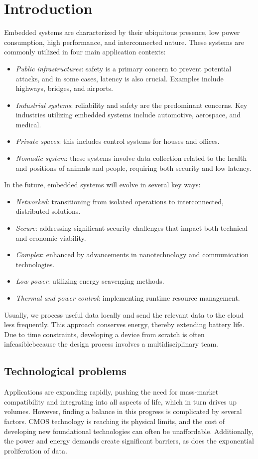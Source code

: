 \section{Introduction}

Embedded systems are characterized by their ubiquitous presence, low power consumption, high performance, and interconnected nature.
These systems are commonly utilized in four main application contexts:
\begin{itemize}
    \item \textit{Public infrastructures}: safety is a primary concern to prevent potential attacks, and in some cases, latency is also crucial. 
        Examples include highways, bridges, and airports.
    \item \textit{Industrial systems}: reliability and safety are the predominant concerns. 
        Key industries utilizing embedded systems include automotive, aerospace, and medical.
    \item \textit{Private spaces}: this includes control systems for houses and offices.
    \item \textit{Nomadic system}: these systems involve data collection related to the health and positions of animals and people, requiring both security and low latency.
\end{itemize}
In the future, embedded systems will evolve in several key ways:
\begin{itemize}
    \item \textit{Networked}: transitioning from isolated operations to interconnected, distributed solutions.
    \item \textit{Secure}: addressing significant security challenges that impact both technical and economic viability.
    \item \textit{Complex}: enhanced by advancements in nanotechnology and communication technologies.
    \item \textit{Low power}: utilizing energy scavenging methods.
    \item \textit{Thermal and power control}: implementing runtime resource management.
\end{itemize}
Usually, we process useful data locally and send the relevant data to the cloud less frequently. 
This approach conserves energy, thereby extending battery life. 
Due to time constraints, developing a device from scratch is often infeasiblebecause the design process involves a multidisciplinary team.

\subsection{Technological problems}
Applications are expanding rapidly, pushing the need for mass-market compatibility and integrating into all aspects of life, which in turn drives up volumes. 
However, finding a balance in this progress is complicated by several factors. 
CMOS technology is reaching its physical limits, and the cost of developing new foundational technologies can often be unaffordable. 
Additionally, the power and energy demands create significant barriers, as does the exponential proliferation of data. 
